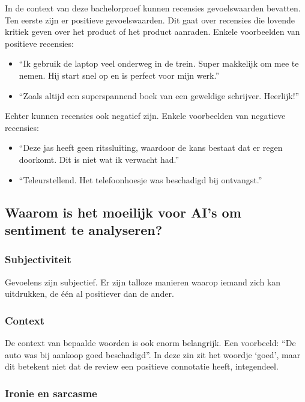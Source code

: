 In de context van deze bachelorproef kunnen recensies gevoelswaarden bevatten. Ten eerste zijn er positieve gevoelswaarden. Dit gaat over recensies die lovende kritiek geven over het product of het product aanraden. Enkele voorbeelden van positieve recensies: 

\begin{itemize}
    \item “Ik gebruik de laptop veel onderweg in de trein. Super makkelijk om mee te nemen. Hij start snel op en is perfect voor mijn werk.”
    \item “Zoals altijd een superspannend boek van een geweldige schrijver. Heerlijk!”
\end{itemize}

Echter kunnen recensies ook negatief zijn. Enkele voorbeelden van negatieve recensies:

\begin{itemize}
    \item “Deze jas heeft geen ritssluiting, waardoor de kans bestaat dat er regen doorkomt. Dit is niet wat ik verwacht had.”
    \item “Teleurstellend. Het telefoonhoesje was beschadigd bij ontvangst.”
\end{itemize}

\subsection{Waarom is het moeilijk voor AI's om sentiment te analyseren?}
\label{moeilijksentimentanalyseren}

\subsubsection{Subjectiviteit}
\label{subjectiviteit}

Gevoelens zijn subjectief. Er zijn talloze manieren waarop iemand zich kan uitdrukken, de één al positiever dan de ander. 

\subsubsection{Context}
\label{context}

De context van bepaalde woorden is ook enorm belangrijk. Een voorbeeld: “De auto was bij aankoop goed beschadigd”. In deze zin zit het woordje ‘goed’, maar dit betekent niet dat de review een positieve connotatie heeft, integendeel. \autocite{MonkeyLearn2021}

\subsubsection{Ironie en sarcasme}
\label{ironiesarcasme}

